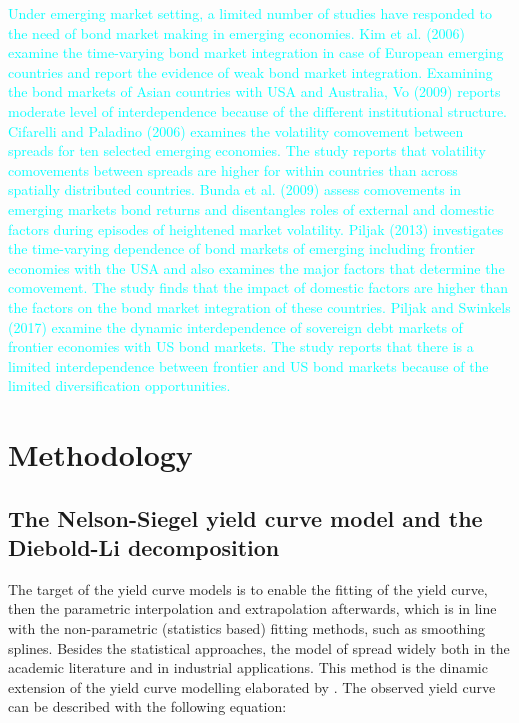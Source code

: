 \documentclass[12pt,bibliography=totoc]{article}
\begin{document}
\textcolor{cyan}{Under emerging market setting, a limited number of studies have responded to the need of bond market making in emerging economies. Kim et al. (2006) examine the time-varying bond market integration in case of European emerging countries and report
the evidence of weak bond market integration. Examining the bond markets of Asian countries with USA and Australia, Vo (2009) reports moderate level of interdependence because of the different institutional structure. Cifarelli and Paladino (2006) examines the volatility comovement between spreads for ten selected emerging economies. The study reports that volatility comovements between spreads are higher for within countries than across spatially distributed countries. Bunda et al. (2009) assess comovements in emerging markets bond returns and disentangles roles of external and domestic factors during episodes of heightened market volatility. Piljak (2013) investigates the time-varying dependence of bond markets of emerging including frontier economies with the 
USA and also examines the major factors that determine the comovement. The study finds that the impact of domestic factors are higher than the factors on the bond market integration of these countries. Piljak and Swinkels (2017) examine the dynamic interdependence of sovereign debt markets of frontier economies with US bond markets. The study reports that there is a limited interdependence between frontier and US bond markets because of the limited diversification opportunities.}



\newpage 


\section{Methodology}
\noindent
\subsection{The Nelson-Siegel yield curve model and the Diebold-Li decomposition}


The target of the yield curve models is to enable the fitting of the yield curve, then the parametric interpolation and extrapolation afterwards, which is in line with the non-parametric (statistics based) fitting methods, such as smoothing splines.
Besides the statistical approaches, the model of \cite{diebold2006forecasting} spread widely both in the academic literature and in industrial applications. This method is the dinamic extension of the yield curve modelling elaborated by \cite{nelson1987parsimonious}. The observed yield curve can be described with the following equation:
\end{document}
